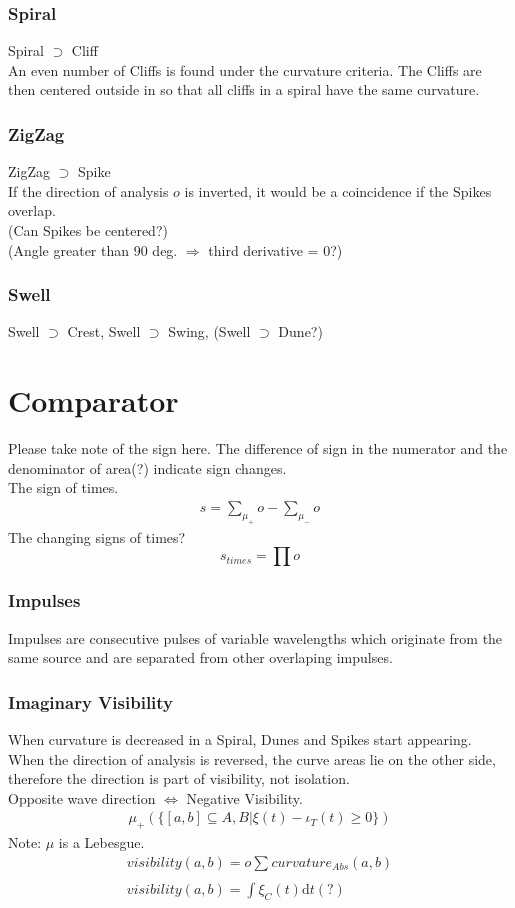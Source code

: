 \documentclass{report}
\begin{document}
\subsection{Spiral}
Spiral $\supset$ Cliff\\
An even number of Cliffs is found under the curvature criteria.
The Cliffs are then centered outside in so that all cliffs in a spiral have the same curvature.
\subsection{ZigZag}
ZigZag $\supset$ Spike\\
If the direction of analysis $o$ is inverted, it would be a coincidence if the Spikes overlap.\\
(Can Spikes be centered?)\\
(Angle greater than 90 deg. $\Rightarrow$ third derivative = 0?)
\subsection{Swell}
Swell $\supset$ Crest, Swell $\supset$ Swing, (Swell $\supset$ Dune?)

\chapter{Comparator}
Please take note of the sign here. The difference of sign in the numerator and the denominator of area(?) indicate sign changes.\\
The sign of times.
\begin{align}
s = \sum_{\mu_{+}}^{}o -  \sum_{\mu_{-}}^{}o
\end{align}
The changing signs of times?
\begin{equation}
s_{times} = \prod o
\end{equation}

\subsection{Impulses}
Impulses are consecutive pulses of variable wavelengths which originate from the same source and are separated from other overlaping impulses.

\subsection{Imaginary Visibility}
When curvature is decreased in a Spiral, Dunes and Spikes start appearing.\\
When the direction of analysis is reversed, the curve areas lie on the other side, therefore the direction is part of visibility, not isolation.\\Opposite wave direction $\Leftrightarrow$ Negative Visibility.
\begin{align}
\mu_{+}(\{[a,b] \subseteq A,B \vert \xi(t) -\iota_{T}(t)\geq0\})
\end{align}
Note: $\mu$ is a Lebesgue.
\begin{align}
visibility(a,b)=o \sum_{}^{} curvature_{Abs}(a,b)\\
visibility(a,b)= \int \limits _{}^{}\xi_{C}(t)\mathrm{d}t(?)
\end{align}
\end{document}
